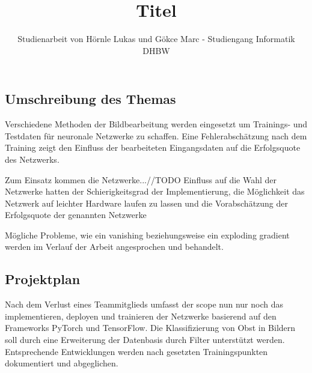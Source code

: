 \documentclass{article}
\title{Titel}
\author{Studienarbeit von Hörnle Lukas und Gökce Marc - Studiengang Informatik DHBW}
\date{}
\begin{document}
\begin{spacing}{1.25}
	\maketitle
	\thispagestyle{empty} %
	
	\subsection*{Umschreibung des Themas}
		Verschiedene Methoden der Bildbearbeitung werden eingesetzt um Trainings- und Testdaten für neuronale Netzwerke zu schaffen. Eine Fehlerabschätzung nach dem Training zeigt den Einfluss der bearbeiteten Eingangsdaten auf die Erfolgsquote des Netzwerks. 
		\newline
		
		Zum Einsatz kommen die Netzwerke...//TODO
		Einfluss auf die Wahl der Netzwerke hatten der Schierigkeitsgrad der Implementierung, die Möglichkeit das Netzwerk auf leichter Hardware laufen zu lassen und die Vorabschätzung der Erfolgsquote der genannten Netzwerke
		\newline
		
		Mögliche Probleme, wie ein vanishing beziehungsweise ein exploding gradient werden im Verlauf der Arbeit angesprochen und behandelt.
		
	\subsection*{Projektplan}
		Nach dem Verlust eines Teammitglieds umfasst der scope nun nur noch das implementieren, deployen und trainieren der Netzwerke basierend auf den Frameworks PyTorch und TensorFlow. Die Klassifizierung von Obst in Bildern soll durch eine Erweiterung der Datenbasis durch Filter unterstützt werden. Entsprechende Entwicklungen werden nach gesetzten Trainingspunkten dokumentiert und abgeglichen. 
\end{spacing}
\end{document}
